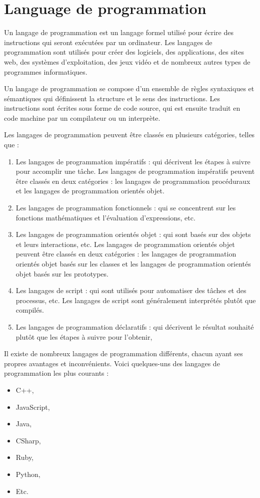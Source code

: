 \section{Language de programmation}\label{sec:language-de-programmation}
Un langage de programmation est un langage formel utilisé pour écrire des instructions qui seront exécutées par un ordinateur. Les langages de programmation sont utilisés pour créer des logiciels, des applications, des sites web, des systèmes d'exploitation, des jeux vidéo et de nombreux autres types de programmes informatiques.

Un langage de programmation se compose d'un ensemble de règles syntaxiques et sémantiques qui définissent la structure et le sens des instructions. Les instructions sont écrites sous forme de code source, qui est ensuite traduit en code machine par un compilateur ou un interprète.

Les langages de programmation peuvent être classés en plusieurs catégories, telles que :
\begin{enumerate}
    \item Les langages de programmation impératifs : qui décrivent les étapes à suivre pour accomplir une tâche. Les langages de programmation impératifs peuvent être classés en deux catégories : les langages de programmation procéduraux et les langages de programmation orientés objet.
    \item Les langages de programmation fonctionnels : qui se concentrent sur les fonctions mathématiques et l'évaluation d'expressions, etc. 
    \item Les langages de programmation orientés objet : qui sont basés sur des objets et leurs interactions,  etc. Les langages de programmation orientés objet peuvent être classés en deux catégories : les langages de programmation orientés objet basés sur les classes et les langages de programmation orientés objet basés sur les prototypes.
    \item Les langages de script : qui sont utilisés pour automatiser des tâches et des processus, etc. Les langages de script sont généralement interprétés plutôt que compilés.
    \item Les langages de programmation déclaratifs : qui décrivent le résultat souhaité plutôt que les étapes à suivre pour l'obtenir, 
\end{enumerate}

Il existe de nombreux langages de programmation différents, chacun ayant ses propres avantages et inconvénients. Voici quelques-uns des langages de programmation les plus courants :
\begin{itemize}
    \item C++,
    \item JavaScript,
    \item Java,
    \item CSharp,
    \item Ruby,
    \item Python,
    \item Etc.
\end{itemize}

